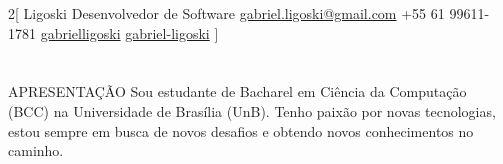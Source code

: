 \documentclass{my_cvPT}
\begin{document}
\begin{multicols}{2}[
        {Ligoski}%
        {Desenvolvedor de Software}%
        {\href{mailto:gabriel.ligoski@gmail.com}{gabriel.ligoski@gmail.com}}%
        {+55 61 99611-1781}%
        {\href{https://github.com/gabrielligoski}{gabrielligoski} }%
        {\href{https://www.linkedin.com/in/gabriel-ligoski/}{gabriel-ligoski} }%
]
\end{multicols}
\vspace{15mm}
\section{\faFileText}{APRESENTAÇÃO}
Sou estudante de Bacharel em Ciência da Computação (BCC) 
na Universidade de Brasília (UnB). Tenho paixão por novas tecnologias, estou 
sempre em busca de novos desafios e obtendo novos conhecimentos no caminho.

\vspace{5mm}
\end{document}
